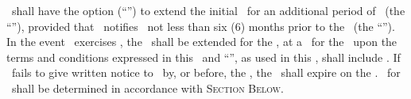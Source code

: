 \lessee\ shall have the option (“\optionI”) to extend the initial \leaseextensionterm\ for an additional period of \optionILength\ (the “\optionITerm”), provided that \lessee\ notifies \lessor\ not less than six (6) months prior to the \newexpdate\ (the “\optionINotif”). In the event \lessee\ exercises \optionI, the \newexpdate\ shall be extended for the \optionITerm, at a \fmv\ for the \premises\ upon the terms and conditions expressed in this \amendmentTitle\ and “\leaseextensionterm”, as used in this \amendmentTitle, shall include \optionITerm. If \lessee\ fails to give written notice to \lessor\ by, or before, the \optionINotif, the \lease\ shall expire on the \newexpdate. \fmv\ for \optionITerm\ shall be determined in accordance with \textsc{Section Below}.
